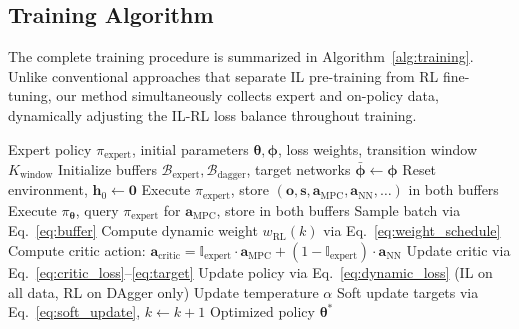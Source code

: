 \subsection{Training Algorithm}

The complete training procedure is summarized in Algorithm~\ref{alg:training}. Unlike conventional approaches that separate IL pre-training from RL fine-tuning, our method simultaneously collects expert and on-policy data, dynamically adjusting the IL-RL loss balance throughout training.

\begin{algorithm}[!t]
\caption{Simultaneous IL-RL Training with Dynamic Loss Weighting}
\label{alg:training}
\begin{algorithmic}[1]
\REQUIRE Expert policy $\pi_{\text{expert}}$, initial parameters $\boldsymbol{\theta}, \boldsymbol{\phi}$, loss weights, transition window $K_{\text{window}}$
\STATE Initialize buffers $\mathcal{B}_{\text{expert}}, \mathcal{B}_{\text{dagger}}$, target networks $\bar{\boldsymbol{\phi}} \leftarrow \boldsymbol{\phi}$
    \STATE Reset environment, $\mathbf{h}_0 \leftarrow \mathbf{0}$
        \STATE Execute $\pi_{\text{expert}}$, store $(\mathbf{o}, \mathbf{s}, \mathbf{a}_{\text{MPC}}, \mathbf{a}_{\text{NN}}, \ldots)$ in both buffers
    \ELSE
        \STATE Execute $\pi_{\boldsymbol{\theta}}$, query $\pi_{\text{expert}}$ for $\mathbf{a}_{\text{MPC}}$, store in both buffers
    \ENDIF
                \STATE Sample batch via Eq.~\ref{eq:buffer}
                \STATE Compute dynamic weight $w_{\text{RL}}(k)$ via Eq.~\ref{eq:weight_schedule}
                \STATE Compute critic action: $\mathbf{a}_{\text{critic}} = \mathbb{I}_{\text{expert}} \cdot \mathbf{a}_{\text{MPC}} + (1 - \mathbb{I}_{\text{expert}}) \cdot \mathbf{a}_{\text{NN}}$
                \STATE Update critic via Eq.~\ref{eq:critic_loss}--\ref{eq:target}
                \STATE Update policy via Eq.~\ref{eq:dynamic_loss} (IL on all data, RL on DAgger only)
                \STATE Update temperature $\alpha$
                \STATE Soft update targets via Eq.~\ref{eq:soft_update}, $k \leftarrow k + 1$
            \ENDFOR
        \ENDIF
    \ENDFOR
\ENDFOR
\RETURN Optimized policy $\boldsymbol{\theta}^*$
\end{algorithmic}
\end{algorithm}

